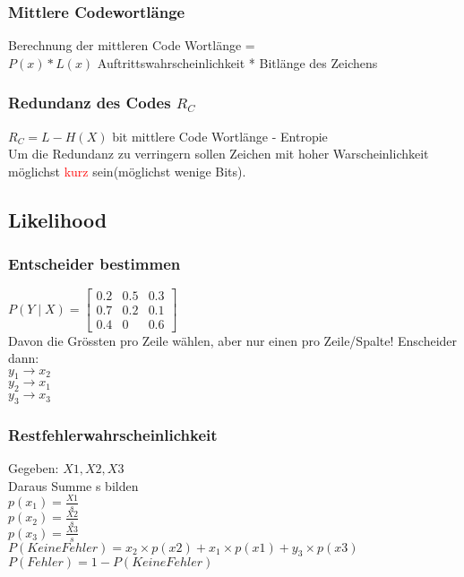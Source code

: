 \subsubsection{Mittlere Codewortlänge}
Berechnung der mittleren Code Wortlänge =\\ \colorbox{lightlightgrey}{$P(x)*L(x)$} Auftrittswahrscheinlichkeit * Bitlänge des Zeichens

\subsubsection{Redundanz des Codes $R_C$}
\colorbox{lightlightgrey}{$R_C = L - H(X)$ bit} mittlere Code Wortlänge - Entropie\\
Um die Redundanz zu verringern sollen Zeichen mit hoher Warscheinlichkeit möglichst \textcolor{red}{kurz} sein(möglichst wenige Bits).



\subsection{Likelihood}
\subsubsection{Entscheider bestimmen}
$P(Y \mid X)=\left[\begin{array}{ccc}0.2 & 0.5 & 0.3 \\ 0.7 & 0.2 & 0.1 \\ 0.4 & 0 & 0.6\end{array}\right]$\\
Davon die Grössten pro Zeile wählen, aber nur einen pro Zeile/Spalte! Enscheider dann:\\
$y_1 \rightarrow x_2$\\
$y_2 \rightarrow x_1$\\
$y_3 \rightarrow x_3$

\subsubsection{Restfehlerwahrscheinlichkeit}
Gegeben: $X1, X2, X3$\\
Daraus Summe s bilden\\
$p\left(x_{1}\right)=\frac{X1}{s}$\\
$p\left(x_{2}\right)=\frac{X2}{s}$\\
$p\left(x_{3}\right)=\frac{X3}{s}$\\

$P(Keine Fehler) = x_2 \times p(x2) + x_1 \times p(x1) + y_3 \times p(x3)$\\
$P(Fehler) = 1- P(Keine Fehler)$



